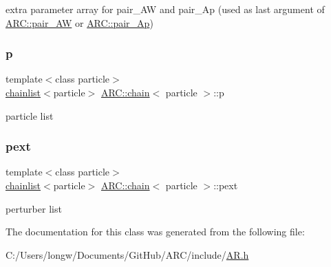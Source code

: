 extra parameter array for pair\+\_\+\+AW and pair\+\_\+\+Ap (used as last argument of \hyperlink{namespaceARC_a5c4308ca4a8d0e0ff59fdce30f00274c}{A\+R\+C\+::pair\+\_\+\+AW} or \hyperlink{namespaceARC_aed8f19a0c6ae7dc0bb3696b337d7b9f6}{A\+R\+C\+::pair\+\_\+\+Ap}) 

\hypertarget{classARC_1_1chain_af1793b656e139e1f87c2e0a55f87514b}{}\label{classARC_1_1chain_af1793b656e139e1f87c2e0a55f87514b} 
\subsubsection{\texorpdfstring{p}{p}}
{\footnotesize\ttfamily template$<$class particle$>$ \\
\hyperlink{classARC_1_1chainlist}{chainlist}$<$particle$>$ \hyperlink{classARC_1_1chain}{A\+R\+C\+::chain}$<$ particle $>$\+::p}



particle list 

\hypertarget{classARC_1_1chain_a6e4f41c7d3f8d44a4a01734ff4ab20cf}{}\label{classARC_1_1chain_a6e4f41c7d3f8d44a4a01734ff4ab20cf} 
\subsubsection{\texorpdfstring{pext}{pext}}
{\footnotesize\ttfamily template$<$class particle$>$ \\
\hyperlink{classARC_1_1chainlist}{chainlist}$<$particle$>$ \hyperlink{classARC_1_1chain}{A\+R\+C\+::chain}$<$ particle $>$\+::pext}



perturber list 



The documentation for this class was generated from the following file\+:\begin{DoxyCompactItemize}
\item 
C\+:/\+Users/longw/\+Documents/\+Git\+Hub/\+A\+R\+C/include/\hyperlink{AR_8h}{A\+R.\+h}\end{DoxyCompactItemize}
